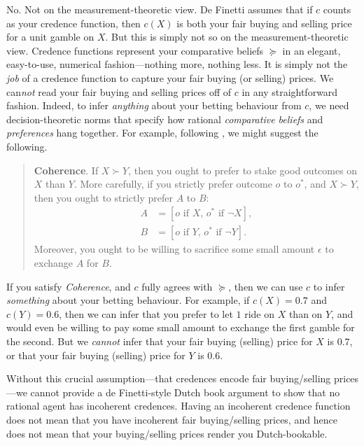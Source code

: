No. Not on the measurement-theoretic view. De Finetti assumes that if $c$ counts as your credence function, then $c(X)$ is both your fair buying and selling price for a unit gamble on $X$. But this is simply not so on the measurement-theoretic view. Credence functions represent your comparative beliefs $\succeq$ in an elegant, easy-to-use, numerical fashion---nothing more, nothing less. It is simply not the \textit{job} of a credence function to capture your fair buying (or selling) prices. We can\textit{not} read your fair buying and selling prices off of $c$ in any straightforward fashion. Indeed, to infer \textit{anything} about your betting behaviour from $c$, we need decision-theoretic norms that specify how rational \textit{comparative beliefs} and \textit{preferences} hang together. For example, following \citep[Section 3.2]{Savage1954}, we might suggest the following.
\begin{quote}
\textbf{Coherence}. If $X\succ Y$, then you ought to prefer to stake good outcomes on $X$ than $Y$. More carefully, if you strictly prefer outcome $o$ to $o^*$, and $X\succ Y$, then you ought to strictly prefer $A$ to $B$:
$$
\begin{aligned}
	A &= \left[o \text{ if } X,\, o^* \text{ if } \neg X\right],\\
	B &= \left[o \text{ if } Y,\, o^* \text{ if } \neg Y\right].
\end{aligned}
$$
Moreover, you ought to be willing to sacrifice some small amount $\epsilon$ to exchange $A$ for $B$.
\end{quote}
If you satisfy \textit{Coherence}, and $c$ fully agrees with $\succeq$, then we can use $c$ to infer \textit{something} about your betting behaviour. For example, if $c(X)=0.7$ and $c(Y)=0.6$, then we can infer that you prefer to let \textsterling$1$ ride on $X$ than on $Y$, and would even be willing to pay some small amount to exchange the first gamble for the second. But we \textit{cannot} infer that your fair buying (selling) price for $X$ is \textsterling$0.7$, or that your fair buying (selling) price for $Y$ is \textsterling$0.6$.

Without this crucial assumption---that credences encode fair buying/selling prices---we cannot provide a de Finetti-style Dutch book argument to show that no rational agent has incoherent credences. Having an incoherent credence function does not mean that you have incoherent fair buying/selling prices, and hence does not mean that your buying/selling prices render you Dutch-bookable.

